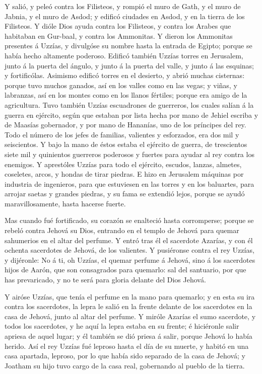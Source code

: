  Y salió, y peleó contra los Filisteos, y rompió el muro de
Gath, y el muro de Jabnia, y el muro de Asdod; y edificó ciudades en
Asdod, y en la tierra de los Filisteos.  Y dióle Dios ayuda
contra los Filisteos, y contra los Arabes que habitaban en Gur-baal, y
contra los Ammonitas.  Y dieron los Ammonitas presentes á
Uzzías, y divulgóse su nombre hasta la entrada de Egipto; porque se
había hecho altamente poderoso.  Edificó también Uzzías
torres en Jerusalem, junto á la puerta del ángulo, y junto á la puerta
del valle, y junto á las esquinas; y fortificólas. 
Asimismo edificó torres en el desierto, y abrió muchas cisternas: porque
tuvo muchos ganados, así en los valles como en las vegas; y viñas, y
labranzas, así en los montes como en los llanos fértiles; porque era
amigo de la agricultura.  Tuvo también Uzzías escuadrones
de guerreros, los cuales salían á la guerra en ejército, según que
estaban por lista hecha por mano de Jehiel escriba y de Maasías
gobernador, y por mano de Hananías, uno de los príncipes del rey.
 Todo el número de los jefes de familias, valientes y
esforzados, era dos mil y seiscientos.  Y bajo la mano de
éstos estaba el ejército de guerra, de trescientos siete mil y
quinientos guerreros poderosos y fuertes para ayudar al rey contra los
enemigos.  Y aprestóles Uzzías para todo el ejército,
escudos, lanzas, almetes, coseletes, arcos, y hondas de tirar piedras.
 E hizo en Jerusalem máquinas por industria de ingenieros,
para que estuviesen en las torres y en los baluartes, para arrojar
saetas y grandes piedras, y su fama se extendió lejos, porque se ayudó
maravillosamente, hasta hacerse fuerte.

 Mas cuando fué fortificado, su corazón se enalteció hasta
corromperse; porque se rebeló contra Jehová su Dios, entrando en el
templo de Jehová para quemar sahumerios en el altar del perfume.
 Y entró tras él el sacerdote Azarías, y con él ochenta
sacerdotes de Jehová, de los valientes.  Y pusiéronse
contra el rey Uzzías, y dijéronle: No á ti, oh Uzzías, el quemar perfume
á Jehová, sino á los sacerdotes hijos de Aarón, que son consagrados para
quemarlo: sal del santuario, por que has prevaricado, y no te será para
gloria delante del Dios Jehová.

 Y airóse Uzzías, que tenía el perfume en la mano para
quemarlo; y en esta su ira contra los sacerdotes, la lepra le salió en
la frente delante de los sacerdotes en la casa de Jehová, junto al altar
del perfume.  Y miróle Azarías el sumo sacerdote, y todos
los sacerdotes, y he aquí la lepra estaba en su frente; é hiciéronle
salir apriesa de aquel lugar; y él también se dió priesa á salir, porque
Jehová lo había herido.  Así el rey Uzzías fué leproso
hasta el día de su muerte, y habitó en una casa apartada, leproso, por
lo que había sido separado de la casa de Jehová; y Joatham su hijo tuvo
cargo de la casa real, gobernando al pueblo de la tierra.

